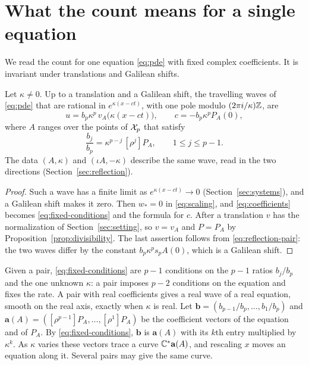 \section{What the count means for a single equation}\label{sec:fixed}

We read the count for one equation \eqref{eq:pde} with fixed complex
coefficients. It is invariant under translations and Galilean shifts.

\begin{proposition}\label{prop:fixed}
Let \(\kappa\ne0\). Up to a translation and a Galilean shift, the
travelling waves of \eqref{eq:pde} that are rational in
\(e^{\kappa(x-ct)}\), with one pole modulo \((2\pi i/\kappa)\mathbb Z\), are
\begin{equation}\label{eq:fixed-wave}
 u=b_p\kappa^p\,v_A\bigl(\kappa(x-ct)\bigr),\qquad c=-b_p\kappa^pP_A(0),
\end{equation}
where \(A\) ranges over the points of \(\mathcal X_p\) that satisfy
\begin{equation}\label{eq:fixed-conditions}
 \frac{b_j}{b_p}=\kappa^{p-j}\,[\rho^j]P_A,\qquad 1\le j\le p-1 .
\end{equation}
The data \((A,\kappa)\) and \((\iota A,-\kappa)\) describe the same
wave, read in the two directions (Section~\ref{sec:reflection}).
\end{proposition}

\begin{proof}
Such a wave has a finite limit as \(e^{\kappa(x-ct)}\to0\)
(Section~\ref{sec:systems}), and a Galilean shift makes it zero. Then
\(w_\ast=0\) in \eqref{eq:scaling}, and \eqref{eq:coefficients} becomes
\eqref{eq:fixed-conditions} and the formula for \(c\). After a
translation \(v\) has the normalization of Section~\ref{sec:setting}, so
\(v=v_A\) and \(P=P_A\) by Proposition~\ref{prop:divisibility}. The last
assertion follows from \eqref{eq:reflection-pair}: the two waves differ
by the constant \(b_p\kappa^ps_pA(0)\), which is a Galilean shift.
\end{proof}

Given a pair, \eqref{eq:fixed-conditions} are \(p-1\) conditions on the
\(p-1\) ratios \(b_j/b_p\) and the one unknown \(\kappa\): a pair
imposes \(p-2\) conditions on the equation and fixes the rate. A pair
with real coefficients gives a real wave of a real equation, smooth on
the real axis, exactly when \(\kappa\) is real. Let
\(\mathbf b=(b_{p-1}/b_p,\ldots,b_1/b_p)\) and
\(\mathbf a(A)=([\rho^{p-1}]P_A,\ldots,[\rho^{1}]P_A)\) be the
coefficient vectors of the equation and of \(P_A\). By
\eqref{eq:fixed-conditions}, \(\mathbf b\) is \(\mathbf a(A)\) with its
\(k\)th entry multiplied by \(\kappa^k\). As \(\kappa\) varies these
vectors trace a curve \(\mathbb C^\ast\mathbf a(A)\), and rescaling \(x\)
moves an equation along it. Several pairs may give the same curve.


